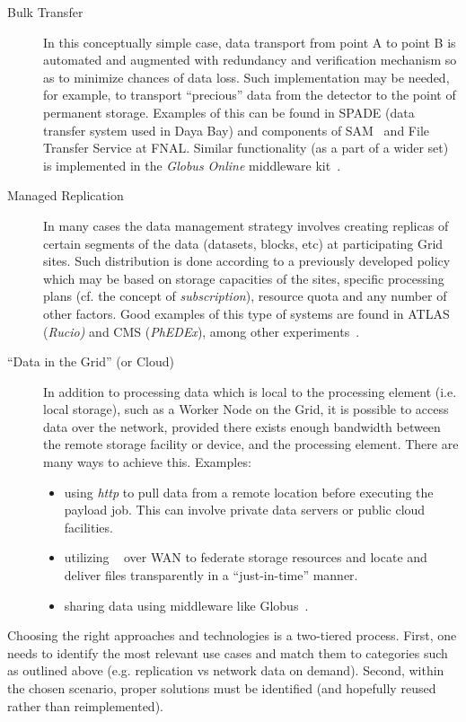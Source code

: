 \begin{description}
\item[Bulk Transfer] In this conceptually simple case, data transport from point A to point B is automated and augmented
with redundancy and verification mechanism so as to minimize chances of data loss. Such implementation may be needed,
for example, to transport ``precious'' data from the detector to the point of permanent storage.
Examples of this can be found in SPADE (data transfer system used in Daya Bay) and components of SAM~\cite{SAM} and File Transfer Service at FNAL.
Similar functionality (as a part of a wider set) is implemented in the \textit{Globus Online} middleware kit~\cite{globus}.

\item[Managed Replication] In many cases the data management strategy involves creating replicas of certain segments of the data (datasets, blocks, etc)
at participating Grid sites. Such distribution is done according to a previously developed policy which may be based on storage capacities of 
the sites, specific processing plans (cf. the concept of \textit{subscription}), resource quota and any number of other factors. Good examples of this type of systems are found in
ATLAS (\textit{Rucio)} and CMS (\textit{PhEDEx}), among other experiments~\cite{rucio_chep13,phedex_chep09}.

\item[``Data in the Grid'' (or Cloud)] In addition to processing data which is local to the processing element (i.e. local storage), such as a Worker Node
on the Grid, it is possible to access data over the network, provided there exists enough bandwidth between the remote storage
facility or device, and the processing element. There are many ways to achieve this. Examples:
\begin{itemize}
\item using \textit{http} to pull data from a remote location before executing the payload job. This can involve private data servers or public cloud facilities.
\item utilizing \xrootd~\cite{xrootd,xrootd_web} over WAN to federate storage resources and locate and deliver files transparently in a ``just-in-time'' manner.
\item sharing data using middleware like Globus~\cite{globus}.
\end{itemize}

\end{description}


Choosing the right approaches and technologies is a two-tiered process. First, one needs to identify the most
 relevant use cases and match them to categories such as outlined above (e.g. replication vs network data on demand). Second, within
 the chosen scenario, proper solutions must be identified (and hopefully reused rather than reimplemented).
   

